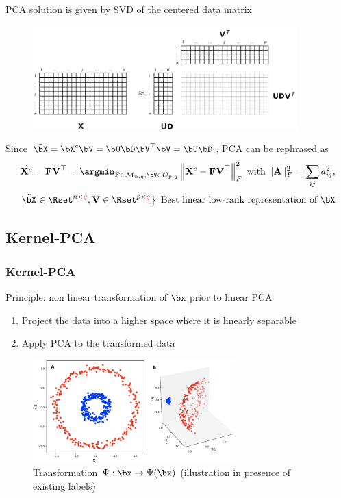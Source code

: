 \documentclass{beamer}\usepackage[]{graphicx}\usepackage[]{color}
\begin{document}
\begin{frame}{PCA solution is given by SVD of the centered data matrix}

\begin{figure}[ht]
  \centering
  \includegraphics[height=4cm]{figures/matrix_factorization}
\end{figure}

Since $\tilde\bX = \mathbf{\bX}^c \bV =  \bU \bD \bV^\top \bV = \bU \bD$, PCA can be rephrased as
\[ \hat{\mathbf{X}^c} = \mathbf{FV}^\top =  \argmin_{\mathbf{F}\in\mathcal{M}_{n,q},\bV\in\mathcal{O}_{p,q} } \left\| \mathbf{X}^c - \mathbf{FV}^\top \right\|_F^2 \text{ with } \|\mathbf{A}\|_F^2 = \sum_{ij} a_{ij}^2, 
\]
\[
  \left. \tilde\bX \in\Rset^{n\times \textcolor{red}{q}}, \mathbf{V}\in\Rset^{p\times \textcolor{red}{q}} \right\} \ \text{Best linear low-rank representation of $\bX$}
\]

\end{frame}
 

\subsection{Kernel-PCA}



\begin{frame}
  \frametitle{Kernel-PCA}
  
  \begin{block}{Principle: non linear transformation of $\bx$ prior to linear PCA} 
    \begin{enumerate}
      \item Project the data into a higher space where it is linearly separable
      \item Apply PCA to the transformed data 
    \end{enumerate}
  \end{block}

  \begin{figure}[ht]
    \centering
    \includegraphics[height=4cm]{figures/kernel_trick2}
    \caption{Transformation $\Psi : \bx \to \Psi(\bx)$ (illustration in presence of existing labels)}
  \end{figure}

\end{frame}
\end{document}
